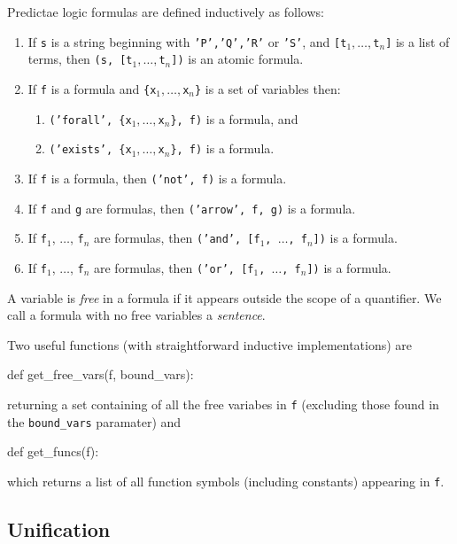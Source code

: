 \documentclass[a4paper,notitlepage]{scrartcl}
\begin{document}
Predictae logic formulas are defined inductively as follows:
\begin{enumerate}
\item If \texttt{s} is a string beginning with \texttt{'P','Q','R'} or \texttt{'S'}, and 
   \texttt{[t$_1,\ldots,$t$_n$]} is a list of terms, then \texttt{(s, [t$_1,
      \ldots, $t$_n$])} is an atomic formula.
\item If \texttt{f} is a formula and \texttt{\{x$_1,\ldots,$x$_n$\}} is a set of
   variables then:
   \begin{enumerate}
      \item \texttt{('forall', \{x$_1,\ldots,$x$_n$\}, f)} is a formula, and
      \item \texttt{('exists', \{x$_1,\ldots,$x$_n$\}, f)} is a formula.
   \end{enumerate}

\item
If \texttt{f} is a formula, then \texttt{('not', f)} is a formula.

\item
If \texttt{f} and \texttt{g} are formulas, then \texttt{('arrow', f, g)} is a
formula.

\item
If \texttt{f}$_1$, $\ldots$, \texttt{f}$_n$ are formulas, then \texttt{('and',
[f$_1$, $\ldots$, f$_n$])} is a formula.

\item
If \texttt{f}$_1$, $\ldots$, \texttt{f}$_n$ are formulas, then \texttt{('or',
[f$_1$, $\ldots$, f$_n$])} is a formula.
\end{enumerate}

A variable is \emph{free} in a formula if it appears outside the scope
   of a quantifier.
We call a formula with no free variables a \emph{sentence}.

Two useful functions (with straightforward inductive implementations) are
\begin{code}
def get_free_vars(f, bound_vars):
\end{code}
returning a set containing of all the free variabes in \texttt{f} (excluding those
   found in the \texttt{bound\_vars} paramater) and
\begin{code}
def get_funcs(f):
\end{code}
which returns a list of all function symbols (including constants) appearing
   in \texttt{f}.

\subsection{Unification}
\end{document}
